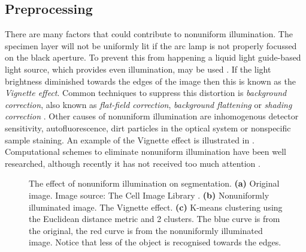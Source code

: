 \subsection{Preprocessing}

\begin{definition}[Nonuniform illumination]
	There are many factors that could contribute to nonuniform illumination.
	The specimen layer will not be uniformly lit if the  arc lamp is not properly focussed on the black aperture.
	To prevent this from happening a liquid light guide-based light source, which provides even illumination, may be used \citep{LichtmanConchello2005}.
	If the light brightness diminished towards the edges of the image then this is known as the \textit{Vignette effect}.
	Common techniques to suppress this distortion is \textit{background correction}, also known as \textit{flat-field correction}, \textit{background flattening} or \textit{shading correction} \citep{Danek2012,Fatima2008,Murphy2001}.
	Other causes of nonuniform illumination are inhomogenous detector sensitivity, autofluorescence, dirt particles in the optical system or nonspecific sample staining.
	An example of the Vignette effect is illustrated in .
	Computational schemes to eliminate nonuniform illumination have been well researched, although recently it has not received too much attention \citep{Young2001,Ghauharali1998,Model2001,Model2001_2}.
	
	\begin{figure}[!t]
		\centering
		\caption{The effect of nonuniform illumination on segmentation. \textbf{(a)} Original image. Image source: The Cell Image Library \citep{cil:21739}. \textbf{(b)} Nonuniformly illuminated image. The Vignette effect. \textbf{(c)} K-means clustering using the Euclidean distance metric and 2 clusters. The blue curve is from the original, the red curve is from the nonuniformly illuminated image. Notice that less of the object is recognised towards the edges.}
		\label{fig:illumination}
	\end{figure}
\end{definition}

